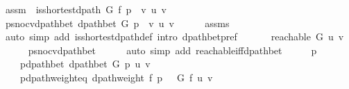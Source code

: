 \begin{isabellebody}
\ assm{\isacharcolon}{\kern0pt}\ {\isachardoublequoteopen}{\isasymnot}\ is{\isacharunderscore}{\kern0pt}shortest{\isacharunderscore}{\kern0pt}dpath\ G\ f\ {\isacharparenleft}{\kern0pt}p\ {\isacharat}{\kern0pt}\ {\isacharbrackleft}{\kern0pt}v{\isacharbrackright}{\kern0pt}{\isacharparenright}{\kern0pt}\ u\ v{\isachardoublequoteclose}\isanewline
\ \ \isamarkupfalse%
\ p{\isacharunderscore}{\kern0pt}snoc{\isacharunderscore}{\kern0pt}v{\isacharunderscore}{\kern0pt}dpath{\isacharunderscore}{\kern0pt}bet{\isacharcolon}{\kern0pt}\ {\isachardoublequoteopen}dpath{\isacharunderscore}{\kern0pt}bet\ G\ {\isacharparenleft}{\kern0pt}p\ {\isacharat}{\kern0pt}\ {\isacharbrackleft}{\kern0pt}v{\isacharbrackright}{\kern0pt}{\isacharparenright}{\kern0pt}\ u\ v{\isachardoublequoteclose}\isanewline
\ \ \ \ \isamarkupfalse%
\ assms\isanewline
\ \ \ \ \isamarkupfalse%
\ {\isacharparenleft}{\kern0pt}auto\ simp\ add{\isacharcolon}{\kern0pt}\ is{\isacharunderscore}{\kern0pt}shortest{\isacharunderscore}{\kern0pt}dpath{\isacharunderscore}{\kern0pt}def\ intro{\isacharcolon}{\kern0pt}\ dpath{\isacharunderscore}{\kern0pt}bet{\isacharunderscore}{\kern0pt}pref{\isacharparenright}{\kern0pt}\isanewline
\ \ \isanewline
\ \ \isamarkupfalse%
\ {\isachardoublequoteopen}reachable\ G\ u\ v{\isachardoublequoteclose}\isanewline
\ \ \ \ \isamarkupfalse%
\ p{\isacharunderscore}{\kern0pt}snoc{\isacharunderscore}{\kern0pt}v{\isacharunderscore}{\kern0pt}dpath{\isacharunderscore}{\kern0pt}bet\isanewline
\ \ \ \ \isamarkupfalse%
\ {\isacharparenleft}{\kern0pt}auto\ simp\ add{\isacharcolon}{\kern0pt}\ reachable{\isacharunderscore}{\kern0pt}iff{\isacharunderscore}{\kern0pt}dpath{\isacharunderscore}{\kern0pt}bet{\isacharparenright}{\kern0pt}\isanewline
\ \ \isamarkupfalse%
\ \isamarkupfalse%
\ p{\isacharprime}{\kern0pt}\ \isanewline
\ \ \ \ p{\isacharprime}{\kern0pt}{\isacharunderscore}{\kern0pt}dpath{\isacharunderscore}{\kern0pt}bet{\isacharcolon}{\kern0pt}\ {\isachardoublequoteopen}dpath{\isacharunderscore}{\kern0pt}bet\ G\ p{\isacharprime}{\kern0pt}\ u\ v{\isachardoublequoteclose}\ \isanewline
\ \ \ \ p{\isacharprime}{\kern0pt}{\isacharunderscore}{\kern0pt}dpath{\isacharunderscore}{\kern0pt}weight{\isacharunderscore}{\kern0pt}eq{\isacharunderscore}{\kern0pt}{\isasymdelta}{\isacharcolon}{\kern0pt}\ {\isachardoublequoteopen}dpath{\isacharunderscore}{\kern0pt}weight\ f\ p{\isacharprime}{\kern0pt}\ {\isacharequal}{\kern0pt}\ {\isasymdelta}\ G\ f\ u\ v{\isachardoublequoteclose}\isanewline

\end{isabellebody}
